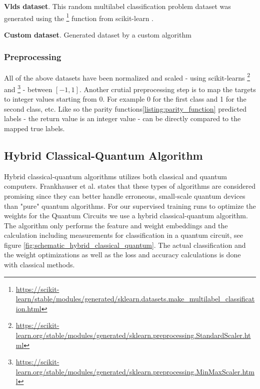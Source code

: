 \textbf{Vlds dataset}. This random multilabel classification problem dataset was generated using the \footnote{\url{https://scikit-learn/stable/modules/generated/sklearn.datasets.make_multilabel_classification.html}} function from scikit-learn\cite{scikit-learn} \cite{SklearnDatasetsMake}.

\textbf{Custom dataset}. Generated dataset by a custom algorithm 

\subsubsection{Preprocessing}
All of the above datasets have been normalized and scaled - using scikit-learns  \footnote{\url{https://scikit-learn.org/stable/modules/generated/sklearn.preprocessing.StandardScaler.html}} and \footnote{\url{https://scikit-learn.org/stable/modules/generated/sklearn.preprocessing.MinMaxScaler.html}} - between $[-1, 1]$. Another crutial preprocessing step is to map the targets to integer values starting from 0. For example 0 for the first class and 1 for the second class, etc. Like so the parity functions\ref{listing:parity_function} predicted labels - the return value is an integer value - can be directly compared to the mapped true labels.

\clearpage

\subsection{Hybrid Classical-Quantum Algorithm}
Hybrid classical-quantum algorithms utilizes both classical and quantum computers. Frankhauser et al. \cite{fankhauser_multiple_2021} states that these types of algorithms are considered promising since they can better handle erroneous, small-scale quantum devices than "pure" quantum algorithms.
For our supervised training runs to optimize the weights for the Quantum Circuits we use a hybrid classical-quantum algorithm. The algorithm only performs the feature and weight embeddings and the calculation including measurements for classification in a quantum circuit, see figure \ref{fig:schematic_hybrid_classical_quantum}. The actual classification and the weight optimizations as well as the loss and accuracy calculations is done with classical methods. 

